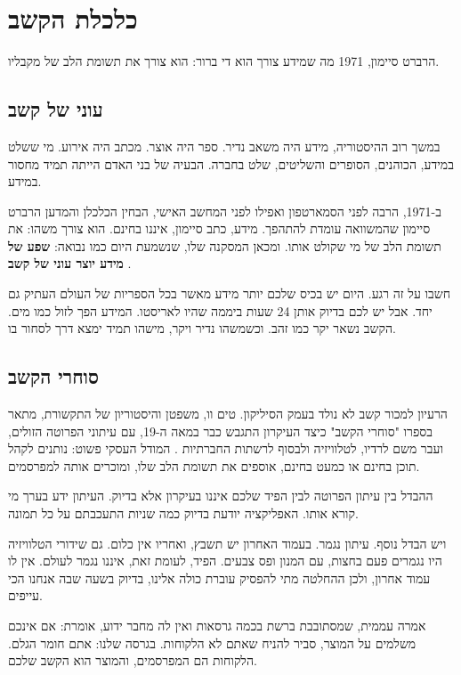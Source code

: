 \chapter{כלכלת הקשב}
\label{ch:attention}

\begin{epigraph}{הרברט סיימון, 1971}
מה שמידע צורך הוא די ברור: הוא צורך את תשומת הלב של מקבליו.
\end{epigraph}

\section{עוני של קשב}

במשך רוב ההיסטוריה, מידע היה משאב נדיר. ספר היה אוצר. מכתב היה אירוע. מי ששלט במידע, הכוהנים, הסופרים והשליטים, שלט בחברה. הבעיה של בני האדם הייתה תמיד מחסור במידע.

ב-1971, הרבה לפני הסמארטפון ואפילו לפני המחשב האישי, הבחין הכלכלן והמדען הרברט סיימון שהמשוואה עומדת להתהפך. מידע, כתב סיימון, איננו בחינם. הוא צורך משהו: את תשומת הלב של מי שקולט אותו. ומכאן המסקנה שלו, שנשמעת היום כמו נבואה: \textbf{שפע של מידע יוצר עוני של קשב} \parencite{simon1971}.

חשבו על זה רגע. היום יש בכיס שלכם יותר מידע מאשר בכל הספריות של העולם העתיק גם יחד. אבל יש לכם בדיוק אותן 24 שעות ביממה שהיו לאריסטו. המידע הפך לזול כמו מים. הקשב נשאר יקר כמו זהב. וכשמשהו נדיר ויקר, מישהו תמיד ימצא דרך לסחור בו.

\section{סוחרי הקשב}

הרעיון למכור קשב לא נולד בעמק הסיליקון. טים וו, משפטן והיסטוריון של התקשורת, מתאר בספרו "סוחרי הקשב" כיצד העיקרון התגבש כבר במאה ה-19, עם עיתוני הפרוטה הזולים, ועבר משם לרדיו, לטלוויזיה ולבסוף לרשתות החברתיות \parencite{wu2016}. המודל העסקי פשוט: נותנים לקהל תוכן בחינם או כמעט בחינם, אוספים את תשומת הלב שלו, ומוכרים אותה למפרסמים.

ההבדל בין עיתון הפרוטה לבין הפיד שלכם איננו בעיקרון אלא בדיוק. העיתון ידע בערך מי קורא אותו. האפליקציה יודעת בדיוק כמה שניות התעכבתם על כל תמונה.

ויש הבדל נוסף. עיתון נגמר. בעמוד האחרון יש תשבץ, ואחריו אין כלום. גם שידורי הטלוויזיה היו נגמרים פעם בחצות, עם המנון ופס צבעים. הפיד, לעומת זאת, איננו נגמר לעולם. אין לו עמוד אחרון, ולכן ההחלטה מתי להפסיק עוברת כולה אלינו, בדיוק בשעה שבה אנחנו הכי עייפים.

\begin{factbox}
אמרה עממית, שמסתובבת ברשת בכמה גרסאות ואין לה מחבר ידוע, אומרת: אם אינכם משלמים על המוצר, סביר להניח שאתם לא הלקוחות. בגרסה שלנו: אתם חומר הגלם. הלקוחות הם המפרסמים, והמוצר הוא הקשב שלכם.
\end{factbox}

